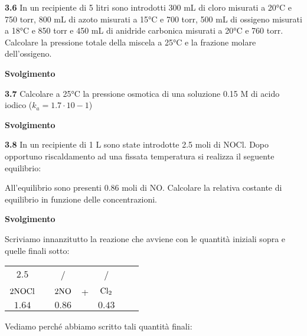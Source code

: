 \vspace{0.2cm}\textbf{3.6} In un recipiente di 5 litri sono introdotti 300 mL di cloro misurati a 20°C e 750 torr, 800 mL di azoto misurati a 15°C e 700 torr, 500 mL di ossigeno misurati a 18°C e 850 torr e 450 mL di anidride carbonica misurati a 20°C e 760 torr. Calcolare la pressione totale della miscela a 25°C e la frazione molare dell’ossigeno.

\vspace{0.2cm}\large\textbf{Svolgimento}\normalsize

\vspace{0.2cm}

\vspace{0.2cm}\textbf{3.7} Calcolare a 25°C la pressione osmotica di una soluzione 0.15 M di acido iodico ($k_a= 1.7 \cdot 10-1 $)

\vspace{0.2cm}\large\textbf{Svolgimento}\normalsize

\vspace{0.2cm}

\vspace{0.2cm}\textbf{3.8} In un recipiente di 1 L sono state introdotte 2.5 moli di NOCl. Dopo opportuno riscaldamento ad una fissata temperatura si realizza il seguente equilibrio:

\begin{center}
\end{center}

All'equilibrio sono presenti 0.86 moli di NO. Calcolare la relativa costante di equilibrio in funzione delle concentrazioni.

\vspace{0.2cm}\large\textbf{Svolgimento}\normalsize

\vspace{0.2cm}Scriviamo innanzitutto la reazione che avviene con le quantità iniziali sopra e quelle finali sotto: 

\begin{center}
    \begin{tabular}{ccccccc}
        $2.5$ & & / & & /\\
        $\rm 2NOCl$ & \ce{<-->} & $\rm 2NO$ & + & $\rm Cl_2$\\
        $1.64$ & & $0.86$ & & $0.43$\\
    \end{tabular}
\end{center}

Vediamo perché abbiamo scritto tali quantità finali:

